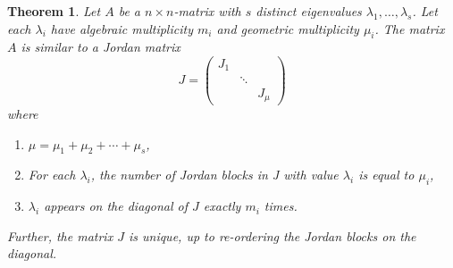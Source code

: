\documentclass[a4paper,11pt]{report}
\newtheorem{theorem}{Theorem}[section]
\begin{document}
\begin{theorem}\label{geschenkuitdehemel}
  Let $A$ be a $n\times n$-matrix with $s$ distinct eigenvalues $\lambda_1, \ldots, 
  \lambda_s$. Let each $\lambda_i$ have algebraic multiplicity $m_i$ and 
  geometric multiplicity $\mu_i$. The matrix $A$ is similar to a Jordan matrix
  $$J = \begin{pmatrix}
  J_1 & & \\
  & \ddots &\\
  && J_\mu
  \end{pmatrix}$$
  where
  \begin{enumerate}
    \item $\mu = \mu_1 + \mu_2 + \cdots + \mu_s$,
        \item For each $\lambda_i$, the number of Jordan blocks in J with value $\lambda_i$ 
    is equal to $\mu_i$,
    \item $\lambda_i$ appears on the diagonal of $J$ exactly $m_i$ times.
  \end{enumerate}
  Further, the matrix $J$ is unique, up to re-ordering the Jordan blocks on the 
  diagonal.
\end{theorem}
\end{document}
